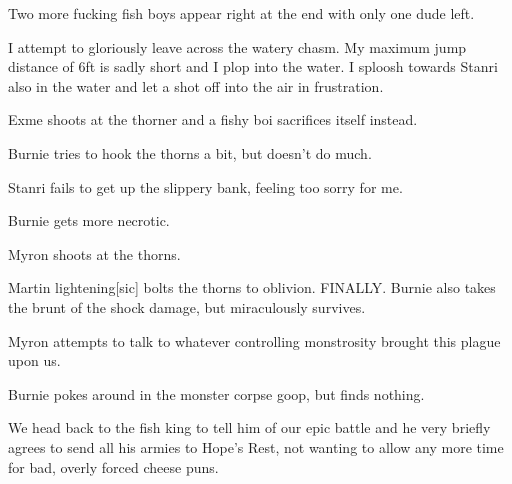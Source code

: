 Two more fucking fish boys appear right at the end with only one dude left.\medskip

I attempt to gloriously leave across the watery chasm. My maximum jump distance of 6ft is sadly short and I plop into the water. I sploosh towards Stanri also in the water and let a shot off into the air in frustration.\medskip

Exme shoots at the thorner and a fishy boi sacrifices itself instead.\medskip

Burnie tries to hook the thorns a bit, but doesn’t do much.\medskip

Stanri fails to get up the slippery bank, feeling too sorry for me.\medskip

Burnie gets more necrotic.\medskip

Myron shoots at the thorns.\medskip

Martin lightening[sic] bolts the thorns to oblivion. FINALLY. Burnie also takes the brunt of the shock damage, but miraculously survives.\medskip

Myron attempts to talk to whatever controlling monstrosity brought this plague upon us.\medskip

Burnie pokes around in the monster corpse goop, but finds nothing.\medskip

We head back to the fish king to tell him of our epic battle and he very briefly agrees to send all his armies to Hope’s Rest, not wanting to allow any more time for bad, overly forced cheese puns.\medskip

%

\clearpage
